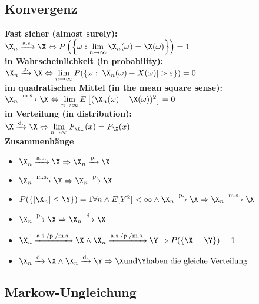 \documentclass[german,color,6pt]{latex4ei/latex4ei_sheet}
\begin{document}
\begin{sectionbox}
	\subsection{Konvergenz}
	\textbf{Fast sicher (almost surely):}\\
	$\X_n \xrightarrow{\text{a.s.}} \X \Leftrightarrow P\left(\left\{\omega: \lim\limits_{n\rightarrow\infty}\X_n(\omega)=\X(\omega)\right\}\right)=1$\\
	\textbf{in Wahrscheinlichkeit (in probability):}\\
	$\X_n\xrightarrow{\text{p.}}\X\Leftrightarrow \lim\limits_{n\rightarrow\infty}P(\{\omega : |\X_n(\omega) - X(\omega)|>\varepsilon\})=0$\\
	\textbf{im quadratischen Mittel (in the mean square sense):}\\
	$\X_n\xrightarrow{\text{m.s.}}\X\Leftrightarrow \lim\limits_{n\rightarrow\infty}E\left[(\X_n(\omega)-\X(\omega))^2\right]=0$\\
	\textbf{in Verteilung (in distribution):}\\
	$\X\xrightarrow{\text{d.}}\X\Leftrightarrow\lim\limits_{n\rightarrow\infty}F_{\X_n}(x)=F_{\X}(x)$\\
	\textbf{Zusammenhänge}
	\begin{itemize}
	\item $\X_n\xrightarrow{\text{a.s.}}\X \Rightarrow \X_n\xrightarrow{\text{p.}}\X$
	\item $\X_n\xrightarrow{\text{m.s.}}\X \Rightarrow \X_n\xrightarrow{\text{p.}}\X$
	\item $P(\{|\X_n|\leq\Y\}) = 1 \forall n \wedge E[Y^2]<\infty\wedge \X_n\xrightarrow{\text{p.}}\X \\ \Rightarrow \X_n\xrightarrow{\text{m.s.}}\X$
	\item $\X_n\xrightarrow{\text{p.}}\X \Rightarrow \X_n\xrightarrow{\text{d.}}\X$
	\item $\X_n\xrightarrow{\text{a.s./p./m.s.}}\X \wedge \X_n\xrightarrow{\text{a.s./p./m.s.}}\Y\Rightarrow P(\{\X=\Y\})=1$
	\item $\X_n\xrightarrow{\text{d.}}\X \wedge \X_n\xrightarrow{\text{d.}}\Y\Rightarrow \X \text{und}\Y\text{haben die gleiche Verteilung}$
	\end{itemize}
\end{sectionbox}

\begin{sectionbox}
	\subsection{Markow-Ungleichung}
\end{sectionbox}
\end{document}
